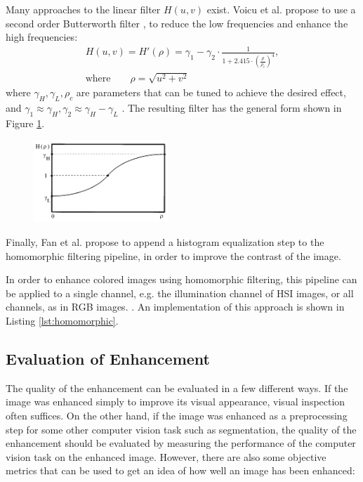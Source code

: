 \documentclass[sigconf]{acmart}
\begin{document}
Many approaches to the linear filter $H(u,v)$ exist. Voicu et al. propose to use a second order Butterworth filter \cite{voicu1997practical}, to reduce the low frequencies and enhance the high frequencies:
\begin{align}
	H(u, v) = H'(\rho) = \gamma_1  - \gamma_2 \cdot \frac{1}{1 + 2.415 \cdot \left(\frac{\rho}{\rho_c}\right)^{4}},\\
	\text{where} \qquad \rho = \sqrt{u^2 + v^2}
\end{align}
where $\gamma_H, \gamma_L, \rho_c$ are parameters that can be tuned to achieve the desired effect, and $\gamma_1 \approx \gamma_H, \gamma_2 \approx \gamma_H - \gamma_L$ \cite{voicu1997practical}. The resulting filter has the general form shown in Figure \ref{fig:homomorphic-filter}.

\begin{figure}
	\centering
	\includegraphics[width=0.45\textwidth]{images/filter.png}
	\label{fig:homomorphic-filter}
\end{figure}

Finally, Fan et al. \cite{fan2011homomorphic} propose  to append a histogram equalization step to the homomorphic filtering pipeline, in order to improve the contrast of the image.

In order to enhance colored images using homomorphic filtering, this pipeline can be applied to a single channel, e.g. the illumination channel of HSI images, or all channels, as in RGB images. \cite{voicu1997practical,fan2011homomorphic}. An implementation of this approach is shown in Listing \ref{lst:homomorphic}.

\subsection{Evaluation of Enhancement}\label{sec:evaluation}
The quality of the enhancement can be evaluated in a few different ways. If the image was enhanced simply to improve its visual appearance, visual inspection often suffices. On the other hand, if the image was enhanced as a preprocessing step for some other computer vision task such as segmentation, the quality of the enhancement should be evaluated by measuring the performance of the computer vision task on the enhanced image. However, there are also some objective metrics that can be used to get an idea of how well an image has been enhanced:
\end{document}
